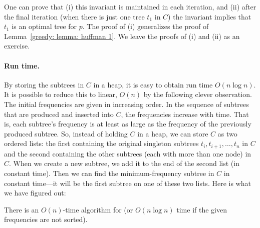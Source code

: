 \medskip

One can prove that (i) this invariant is maintained in each iteration,
and (ii) after the final iteration (when there is just one tree $t_1$ in $C$)
the invariant implies that $t_1$ is an optimal tree for $p$.
The proof of (i) generalizes the proof of Lemma~\ref{greedy: lemma: huffman 1}.
We leave the proofs of (i) and (ii) as an exercise.

\paragraph{Run time.}
By storing the subtrees in $C$ in a heap, it is easy to obtain run time $O(n\log n)$.
It is possible to reduce this to linear, $O(n)$ by the following clever observation.
The initial frequencies are given in increasing order.
In the sequence of subtrees that are produced and inserted into $C$,
the frequencies increase with time.  That is, each subtree's frequency
is at least as large as the frequency of the previously produced subtree.
So, instead of holding $C$ in a heap,
we can store $C$ as two ordered lists:
the first containing the original singleton subtrees $t_i, t_{i+1}, \ldots, t_n$ in $C$
and the second containing the other subtrees (each with more than one node) in $C$.
When we create a new subtree, we add it to the end of the second list (in constant time).
Then we can find the minimum-frequency subtree in $C$ in constant time---it will be the first subtree on one of these two lists.
%
Here is what we have figured out:

\begin{theorem}[Huffman]
  There is an $O(n)$-time algorithm for 
  (or $O(n\log n)$ time if the given frequencies are not sorted).
\end{theorem}



